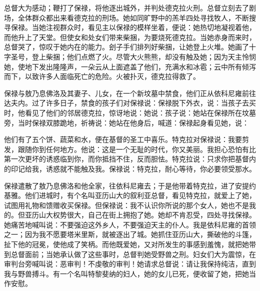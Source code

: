 总督大为感动；鞭打了保禄，将他逐出城外，并判处德克拉火刑。总督立刻去了剧场，全体群众都出来看德克拉的刑场。她如同旷野中的羔羊四处寻找牧人，不断搜寻保禄。当她注视群众时，看见主以保禄的模样坐着，便说：她热切地凝视着他，而他升上了天堂。但使女和处女们带来柴捆，为要烧死德克拉。当她赤身而来时，总督哭了，惊叹于她内在的能力。刽子手们排列好柴捆，让她登上火堆。她画了十字圣号，登上柴捆；他们点燃了火。尽管大火熊熊，却没有触及她；因为天主怜悯她，使地下发出隆隆声，一朵云从上面遮盖了他们，充满水和冰雹；云中所有倾泻而下，以致许多人面临死亡的危险。火被扑灭，德克拉得救了。\par

保禄与敖乃息佛洛及其妻子、儿女，在一个新坟墓中禁食，他们正从依科尼雍前往达夫内。过了许多日子，禁食的孩子们对保禄说：保禄脱下外衣，说：当孩子去买时，他看见了他们的邻居德克拉，惊讶地说：她说：孩子说：她站在保禄所在坟墓旁，当时保禄双膝跪地，祈祷说：她站在他身后，喊道：保禄起身看见她，说：\par

他们有了五个饼、蔬菜和水，便在基督的圣工中喜乐。特克拉对保禄说：我要剪发，跟随你到任何地方。他说：这是一个无耻的时代，你又美丽。我担心恐怕有比第一次更坏的诱惑临到你，而你抵挡不住，反而胆怯。特克拉说：只求你把基督内的印记给我，诱惑就不能触及我。保禄说：特克拉，耐心等待，你必要领受那水。\par

保禄遣散了敖乃息佛洛和他全家，往依科尼雍去；于是他带着特克拉，进了安提约基雅。他们进城时，有个名叫亚历山大的叙利亚总督，看见特克拉，就爱上了她，试图用礼物和馈赠收买保禄。但保禄说：我不认识你所说的那个女人，她也不是我的。但亚历山大权势很大，自己在街上拥抱了她。她却不肯忍受，四处寻找保禄。她痛苦地喊叫说：不要强迫这外乡人，不要强迫天主的仆人。我是依科尼雍的首领之一；因为我不愿要塔米里斯，就被逐出了城。她抓住亚历山大，撕破他的斗篷，扯下他的冠冕，使他成了笑柄。而他既爱她，又对所发生的事感到羞愧，就把她带到总督面前；当她承认做了这些事时，总督判她受野兽之刑。妇女们大为震惊，在审判台旁喊叫说：恶审判！不虔敬的审判！她请求总督说：请让我保持纯洁，直到我与野兽搏斗。有一个名叫特黎斐纳的妇人，她的女儿已死，便收留了她，把她当作安慰。\par

